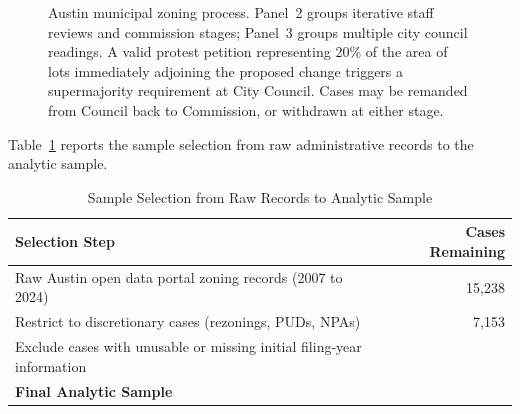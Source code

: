 \documentclass[twoside,11pt]{article}
\begin{document}
\begin{figure}[!htbp]
{%
}
\caption[Austin Municipal Zoning Process]{Austin municipal zoning process. Panel~2 groups iterative staff reviews and commission stages; Panel~3 groups multiple city council readings. A valid protest petition representing 20\% of the area of lots immediately adjoining the proposed change triggers a supermajority requirement at City Council. Cases may be remanded from Council back to Commission, or withdrawn at either stage.}
\label{fig:flowchart}
\end{figure}

Table~\ref{tab:attrition} reports the sample selection from raw administrative records to the analytic sample.

\begin{table}[!htbp]
\centering
\caption{Sample Selection from Raw Records to Analytic Sample}
\label{tab:attrition}
\begin{tabular}{l r}
\toprule
\textbf{Selection Step} & \textbf{Cases Remaining} \\
\midrule
Raw Austin open data portal zoning records (2007 to 2024) & 15,238 \\
Restrict to discretionary cases (rezonings, PUDs, NPAs) & 7,153 \\
Exclude cases with unusable or missing initial filing-year information & \metricBaselineCases{} \\
\midrule
\textbf{Final Analytic Sample} & \textbf{\metricBaselineCases{}} \\
\bottomrule
\end{tabular}
\end{table}
\end{document}
